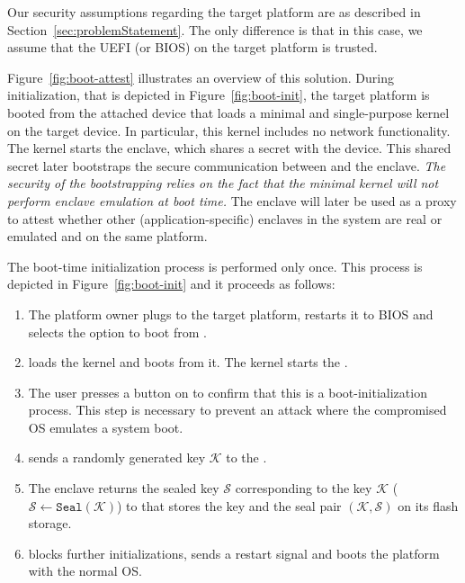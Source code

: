 Our security assumptions regarding the target platform are as described in Section~\ref{sec:problemStatement}. The only difference is that in this case, we assume that the UEFI (or BIOS) on the target platform is trusted.


Figure~\ref{fig:boot-attest} illustrates an overview of this solution. During initialization, that is depicted in Figure~\ref{fig:boot-init}, the target platform is booted from the attached device that loads a minimal and single-purpose \name kernel on the target device. In particular, this kernel includes no network functionality. The kernel starts the \name enclave, which shares a secret with the device. This shared secret later bootstraps the secure communication between \device and the \name enclave. \emph{The security of the bootstrapping relies on the fact that the minimal kernel will not perform enclave emulation at boot time.} The \name enclave will later be used as a proxy to attest whether other (application-specific) enclaves in the system are real or emulated and on the same platform.


 The boot-time initialization process is performed only once.
This process is depicted in Figure~\ref{fig:boot-init} and it proceeds as follows:


\begin{enumerate}
  \item[\one] The platform owner plugs \device to the target platform, restarts it to BIOS and selects the option to boot from \device.
  \item[\two] \device loads the \name kernel and boots from it. The \name kernel starts the \nameclave.
  \item[\three] The user presses a button on \device to confirm that this is a boot-initialization process. This step is necessary to prevent an attack where the compromised OS emulates a system boot.
  \item[\four] \device sends a randomly generated key $\mathcal{K}$ to the \nameclave.
  \item[\five] The enclave returns the sealed key $\mathcal{S}$ corresponding to the key $\mathcal{K}$ ($\mathcal{S}\leftarrow\texttt{Seal}(\mathcal{K})$) to \device that stores the key and the seal pair $(\mathcal{K}, \mathcal{S})$ on its flash storage.
  \item[\six] \device blocks further initializations, sends a restart signal and boots the platform with the normal OS.
\end{enumerate}


